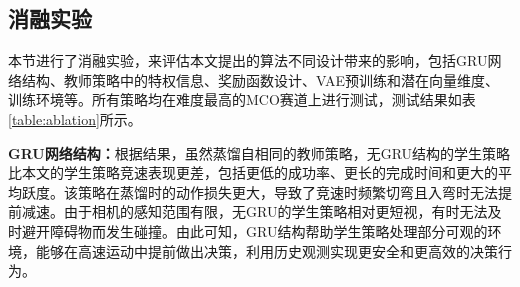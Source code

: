 \subsection{消融实验}
\begin{table}[ht]
\renewcommand{\arraystretch}{1.25}
\caption{不同策略在MCO赛道下的消融实验}
\centering
{}
\label{table:ablation}
\end{table}
本节进行了消融实验，来评估本文提出的算法不同设计带来的影响，包括GRU网络结构、教师策略中的特权信息、奖励函数设计、VAE预训练和潜在向量维度、训练环境等。所有策略均在难度最高的MCO赛道上进行测试，测试结果如表\ref{table:ablation}所示。

\textbf{GRU网络结构：}根据结果，虽然蒸馏自相同的教师策略，无GRU结构的学生策略比本文的学生策略竞速表现更差，包括更低的成功率、更长的完成时间和更大的平均跃度。该策略在蒸馏时的动作损失更大，导致了竞速时频繁切弯且入弯时无法提前减速。由于相机的感知范围有限，无GRU的学生策略相对更短视，有时无法及时避开障碍物而发生碰撞。由此可知，GRU结构帮助学生策略处理部分可观的环境，能够在高速运动中提前做出决策，利用历史观测实现更安全和更高效的决策行为。

